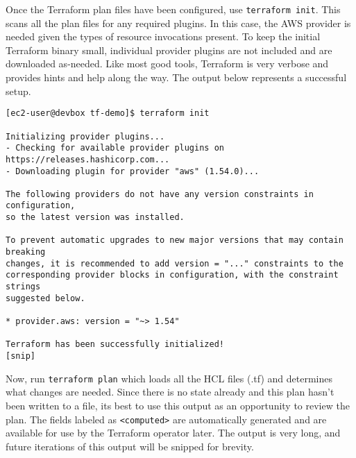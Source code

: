 Once the Terraform plan files have been configured, use \verb|terraform init|.
This scans all the plan files for any required plugins. In this case, the AWS
provider is needed given the types of resource invocations present. To keep
the initial Terraform binary small, individual provider plugins are not
included and are downloaded as-needed. Like most good tools, Terraform is very
verbose and provides hints and help along the way. The output below represents
a successful setup.

\begin{verbatim}
[ec2-user@devbox tf-demo]$ terraform init

Initializing provider plugins...
- Checking for available provider plugins on https://releases.hashicorp.com...
- Downloading plugin for provider "aws" (1.54.0)...

The following providers do not have any version constraints in configuration,
so the latest version was installed.

To prevent automatic upgrades to new major versions that may contain breaking
changes, it is recommended to add version = "..." constraints to the
corresponding provider blocks in configuration, with the constraint strings
suggested below.

* provider.aws: version = "~> 1.54"

Terraform has been successfully initialized!
[snip]
\end{verbatim}

Now, run \verb|terraform plan| which loads all the HCL files (.tf) and determines
what changes are needed. Since there is no state already and this plan hasn't
been written to a file, its best to use this output as an opportunity to
review the plan. The fields labeled as \verb|<computed>| are automatically generated
and are available for use by the Terraform operator later. The output is very
long, and future iterations of this output will be snipped for brevity.


